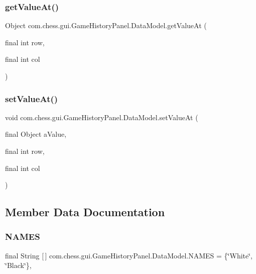 \subsubsection{\texorpdfstring{getValueAt()}{getValueAt()}}
{\footnotesize\ttfamily Object com.\+chess.\+gui.\+Game\+History\+Panel.\+Data\+Model.\+get\+Value\+At (\begin{DoxyParamCaption}\item[{final int}]{row,  }\item[{final int}]{col }\end{DoxyParamCaption})}

\mbox{\label{classcom_1_1chess_1_1gui_1_1_game_history_panel_1_1_data_model_a8280ab4c921fb8d1534fde3fac479e2f}} 
\subsubsection{\texorpdfstring{setValueAt()}{setValueAt()}}
{\footnotesize\ttfamily void com.\+chess.\+gui.\+Game\+History\+Panel.\+Data\+Model.\+set\+Value\+At (\begin{DoxyParamCaption}\item[{final Object}]{a\+Value,  }\item[{final int}]{row,  }\item[{final int}]{col }\end{DoxyParamCaption})}



\subsection{Member Data Documentation}
\mbox{\label{classcom_1_1chess_1_1gui_1_1_game_history_panel_1_1_data_model_abb2f0f82fb40c586572bd7a9d196e1a2}} 
\subsubsection{\texorpdfstring{NAMES}{NAMES}}
{\footnotesize\ttfamily final String \mbox{[}$\,$\mbox{]} com.\+chess.\+gui.\+Game\+History\+Panel.\+Data\+Model.\+N\+A\+M\+ES = \{\char`\"{}White\char`\"{}, \char`\"{}Black\char`\"{}\}\hspace{0.3cm}{\ttfamily [static]}, {\ttfamily [private]}}

